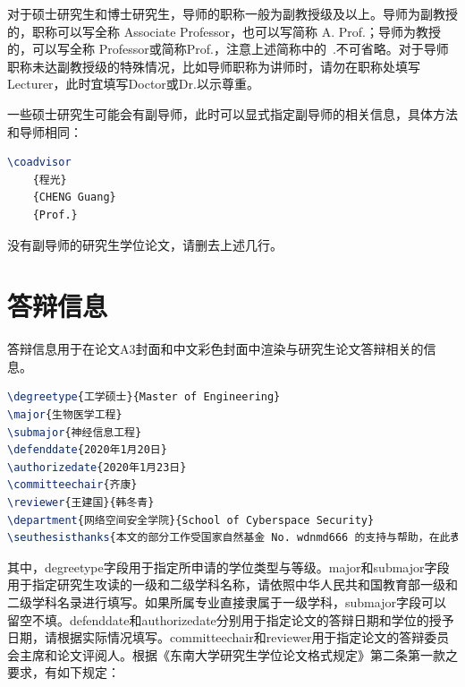 \noindent 对于硕士研究生和博士研究生，导师的职称一般为副教授级及以上。导师为副教授的，职称可以写全称 Associate Professor，也可以写简称 A. Prof.；导师为教授的，可以写全称 Professor或简称Prof.，注意上述简称中的~.不可省略。对于导师职称未达副教授级的特殊情况，比如导师职称为讲师时，请勿在职称处填写Lecturer，此时宜填写Doctor或Dr.以示尊重。

一些硕士研究生可能会有副导师，此时可以显式指定副导师的相关信息，具体方法和导师相同：

\begin{tcolorbox}
\begin{lstlisting}[language=TeX]
\coadvisor
    {程光}
    {CHENG Guang}
    {Prof.}
\end{lstlisting}
\end{tcolorbox}

\noindent 没有副导师的研究生学位论文，请删去上述几行。

\section{答辩信息}

答辩信息用于在论文A3封面和中文彩色封面中渲染与研究生论文答辩相关的信息。

\begin{tcolorbox}
\begin{lstlisting}[language=TeX]
\degreetype{工学硕士}{Master of Engineering}
\major{生物医学工程}
\submajor{神经信息工程}
\defenddate{2020年1月20日}
\authorizedate{2020年1月23日}
\committeechair{齐康}
\reviewer{王建国}{韩冬青}
\department{网络空间安全学院}{School of Cyberspace Security}
\seuthesisthanks{本文的部分工作受国家自然基金 No. wdnmd666 的支持与帮助，在此表示感谢。}
\end{lstlisting}
\end{tcolorbox}

其中，{\codefont degreetype}字段用于指定所申请的学位类型与等级。{\codefont major}和{\codefont submajor}字段用于指定研究生攻读的一级和二级学科名称，请依照中华人民共和国教育部一级和二级学科名录进行填写。如果所属专业直接隶属于一级学科，{\codefont submajor}字段可以留空不填。{\codefont defenddate}和{\codefont authorizedate}分别用于指定论文的答辩日期和学位的授予日期，请根据实际情况填写。{\codefont committeechair}和{\codefont reviewer}用于指定论文的答辩委员会主席和论文评阅人。根据《东南大学研究生学位论文格式规定》\cite{seugs2015rule}第二条第一款之要求，有如下规定：

~


